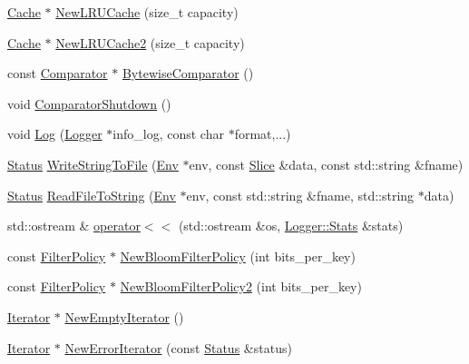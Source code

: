 \begin{DoxyCompactItemize}
\item 
\hyperlink{classleveldb_1_1_cache}{Cache} $\ast$ \hyperlink{namespaceleveldb_a231e1b41322a8b342c91a15a78e425d4}{New\+L\+R\+U\+Cache} (size\+\_\+t capacity)
\item 
\hyperlink{classleveldb_1_1_cache}{Cache} $\ast$ \hyperlink{namespaceleveldb_acce888b6f6358210bf2cab5a67178709}{New\+L\+R\+U\+Cache2} (size\+\_\+t capacity)
\item 
const \hyperlink{structleveldb_1_1_comparator}{Comparator} $\ast$ \hyperlink{namespaceleveldb_acd67740962c806afe8f4098cb153d25c}{Bytewise\+Comparator} ()
\item 
void \hyperlink{namespaceleveldb_abd757092673aec375d685d40689031a0}{Comparator\+Shutdown} ()
\item 
void \hyperlink{namespaceleveldb_aeba9623ceee38be99bed2bc1ae082954}{Log} (\hyperlink{classleveldb_1_1_logger}{Logger} $\ast$info\+\_\+log, const char $\ast$format,...)
\item 
\hyperlink{classleveldb_1_1_status}{Status} \hyperlink{namespaceleveldb_ae01563eb18a8527096b54d60251351cb}{Write\+String\+To\+File} (\hyperlink{classleveldb_1_1_env}{Env} $\ast$env, const \hyperlink{classleveldb_1_1_slice}{Slice} \&data, const std\+::string \&fname)
\item 
\hyperlink{classleveldb_1_1_status}{Status} \hyperlink{namespaceleveldb_aa47a20ae782e9ad537692c3202cd652d}{Read\+File\+To\+String} (\hyperlink{classleveldb_1_1_env}{Env} $\ast$env, const std\+::string \&fname, std\+::string $\ast$data)
\item 
std\+::ostream \& \hyperlink{namespaceleveldb_a19b11ed49e84d77cae63ae2774003bfa}{operator$<$$<$} (std\+::ostream \&os, \hyperlink{structleveldb_1_1_logger_1_1_stats}{Logger\+::\+Stats} \&stats)
\item 
const \hyperlink{classleveldb_1_1_filter_policy}{Filter\+Policy} $\ast$ \hyperlink{namespaceleveldb_ae6b34bf2331983721554f284b1eaa1a1}{New\+Bloom\+Filter\+Policy} (int bits\+\_\+per\+\_\+key)
\item 
const \hyperlink{classleveldb_1_1_filter_policy}{Filter\+Policy} $\ast$ \hyperlink{namespaceleveldb_aa6275e4d019036c55f66fb9515e0dc53}{New\+Bloom\+Filter\+Policy2} (int bits\+\_\+per\+\_\+key)
\item 
\hyperlink{classleveldb_1_1_iterator}{Iterator} $\ast$ \hyperlink{namespaceleveldb_a3293c30e4a309a7293598b1db0f3e687}{New\+Empty\+Iterator} ()
\item 
\hyperlink{classleveldb_1_1_iterator}{Iterator} $\ast$ \hyperlink{namespaceleveldb_ab2c425a5fcb13b97e50e32c7b93186f5}{New\+Error\+Iterator} (const \hyperlink{classleveldb_1_1_status}{Status} \&status)

\end{DoxyCompactItemize}
